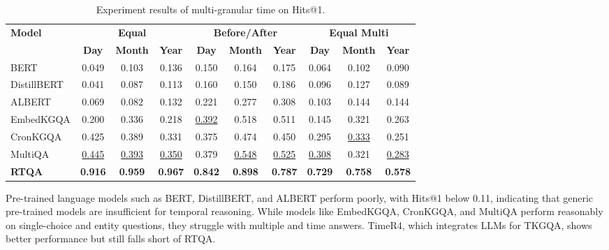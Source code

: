 \documentclass[11pt]{article}
\begin{document}
\begin{table}[t]
\caption{Experiment results of multi-granular time on Hits@1.}
\label{tab:multi_granularity time}
\vspace{-0.5em}
\centering
\small
\setlength{\tabcolsep}{8pt} %
\begin{adjustbox}{max width=\textwidth} %
\begin{tabular}{lccccccccc}
\toprule
\multirow{2}{*}{\textbf{Model}} & \multicolumn{3}{c}{\textbf{Equal}} & \multicolumn{3}{c}{\textbf{Before/After}} & \multicolumn{3}{c}{\textbf{Equal Multi}} \\
\cmidrule(lr){2-4} \cmidrule(lr){5-7} \cmidrule(lr){8-10}
& \textbf{Day} & \textbf{Month} & \textbf{Year} & \textbf{Day} & \textbf{Month} & \textbf{Year} & \textbf{Day} & \textbf{Month} & \textbf{Year} \\
\midrule
BERT & 0.049 & 0.103 & 0.136 & 0.150 & 0.164 & 0.175 & 0.064 & 0.102 & 0.090 \\
DistillBERT & 0.041 & 0.087 & 0.113 & 0.160 & 0.150 & 0.186 & 0.096 & 0.127 & 0.089 \\
ALBERT & 0.069 & 0.082 & 0.132 & 0.221 & 0.277 & 0.308 & 0.103 & 0.144 & 0.144 \\
EmbedKGQA & 0.200 & 0.336 & 0.218 & \underline{0.392} & 0.518 & 0.511 & 0.145 & 0.321 & 0.263 \\
CronKGQA & 0.425 & 0.389 & 0.331 & 0.375 & 0.474 & 0.450 & 0.295 & \underline{0.333} & 0.251 \\
MultiQA & \underline{0.445} & \underline{0.393} & \underline{0.350} & 0.379 & \underline{0.548} & \underline{0.525} & \underline{0.308} & 0.321 & \underline{0.283} \\
\midrule
\textbf{RTQA} & \textbf{0.916} & \textbf{0.959} & \textbf{0.967} & \textbf{0.842} & \textbf{0.898} & \textbf{0.787} & \textbf{0.729} & \textbf{0.758} & \textbf{0.578} \\
\bottomrule
\end{tabular}
\end{adjustbox}
\vspace{-0.5em}

\end{table}


Pre-trained language models such as BERT, DistillBERT, and ALBERT perform poorly, with Hits@1 below 0.11, indicating that generic pre-trained models are insufficient for temporal reasoning. While models like EmbedKGQA, CronKGQA, and MultiQA perform reasonably on single-choice and entity questions, they struggle with multiple and time answers. TimeR4, which integrates LLMs for TKGQA, shows better performance but still falls short of RTQA.
\end{document}

